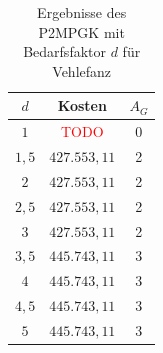 \documentclass[11pt,a4paper]{article}
\newcommand{\TODO}{\textcolor{red}{TODO}}
\theoremstyle{my_th_style1}
\begin{document}
\begin{table}[h]
	\centering
	\begin{tabular}{c|c|c}
		\centering
		$d$ & Kosten & $A_G$ \\	
		\hline
		$1$   	 &  \TODO& 0  \\
		$1,5$ 	&   $427.553,11$  & 2  \\
		$2$   	&   $427.553,11$ & 2  \\
		$2,5$   	&   $427.553,11$ & 2  \\
		$3$    &   $427.553,11$ & 2  \\
		$3,5$   	&   $445.743,11$ & 3  \\
		$4$   	&   $445.743,11$& 3  \\
		$4,5$    & $445.743,11$ & 3 \\
		$5$   	&   $445.743,11$& 3  \\	
	\end{tabular}
	\label{P2PGKBedarfV}
	\caption{Ergebnisse des P2MPGK mit Bedarfsfaktor $d$ f\"ur Vehlefanz} 
\end{table}


\thispagestyle{empty}
\end{document}
